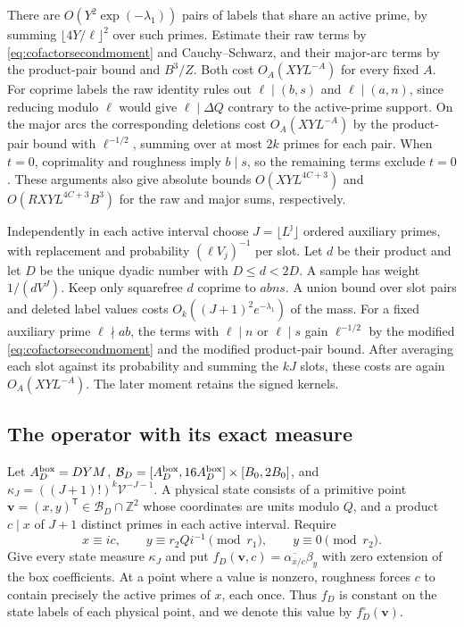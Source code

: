 \documentclass[11pt]{amsart}
\numberwithin{equation}{section}
\theoremstyle{remark}
\begin{document}
There are $O(Y^2\exp(-\lambda_1))$ pairs of labels that share an
active prime, by summing $\lfloor4Y/\ell\rfloor^2$ over such primes.
Estimate their raw terms by \eqref{eq:cofactorsecondmoment} and
Cauchy--Schwarz, and their major-arc terms by the product-pair bound
and $B^3/Z$. Both cost $O_A(XYL^{-A})$ for every fixed $A$.
For coprime labels the raw identity rules out $\ell\mid(b,s)$ and
$\ell\mid(a,n)$, since reducing modulo $\ell$ would give
$\ell\mid\Delta Q$ contrary to the active-prime support.
On the major arcs the corresponding deletions cost $O_A(XYL^{-A})$
by the product-pair bound with $\ell^{-1/2}$, summing over at most $2k$
primes for each pair. When $t=0$, coprimality and roughness imply
$b\mid s$, so the remaining terms exclude $t=0$. These arguments also
give absolute bounds $O(XYL^{4C+3})$ and $O(RXYL^{4C+3}B^3)$ for the raw
and major sums, respectively.

Independently in each active interval choose $J=\lfloor L^\jmath\rfloor$
ordered auxiliary primes, with replacement and probability
$(\ell V_j)^{-1}$ per slot. Let $d$ be their product and let $D$ be the
unique dyadic number with $D\le d<2D$. A sample has weight $1/(dV^J)$.
Keep only squarefree $d$ coprime to $abns$. A union bound over slot
pairs and deleted label values costs $O_k((J+1)^2e^{-\lambda_1})$ of
the mass. For a fixed auxiliary prime $\ell\nmid ab$, the terms with
$\ell\mid n$ or $\ell\mid s$ gain $\ell^{-1/2}$ by the modified
\eqref{eq:cofactorsecondmoment} and the modified product-pair bound.
After averaging each slot against its probability and summing the
$kJ$ slots, these costs are again $O_A(XYL^{-A})$. The later moment retains the signed kernels.

\subsection{The operator with its exact measure}

Let $A_D^{\rm box}=DYM$, $\mathcal B_D=[A_D^{\rm box},16A_D^{\rm box}]\times[B_0,2B_0]$,
and $\kappa_J=((J+1)!)^k \mathcal V^{-J-1}$. A physical state consists of a
primitive point $\mathbf v=(x,y)^{\mathsf T}\in\mathcal B_D\cap\mathbb Z^2$
whose coordinates are units modulo $Q$, and a product $c\mid x$ of
$J+1$ distinct primes in each active interval. Require
\begin{equation}\label{eq:stateprojections}
 x\equiv ic,\qquad y\equiv r_2Qi^{-1}\pmod{r_1},
 \qquad y\equiv0\pmod{r_2}.
\end{equation}
Give every state measure $\kappa_J$ and put
$f_D(\mathbf v,c)=\overline{\alpha_{x/c}}\beta_y$ with zero extension of
the box coefficients. At a point where a value is nonzero, roughness
forces $c$ to contain precisely the active primes of $x$, each once.
Thus $f_D$ is constant on the state labels of each physical point,
and we denote this value by $f_D^\circ(\mathbf v)$.
\end{document}
